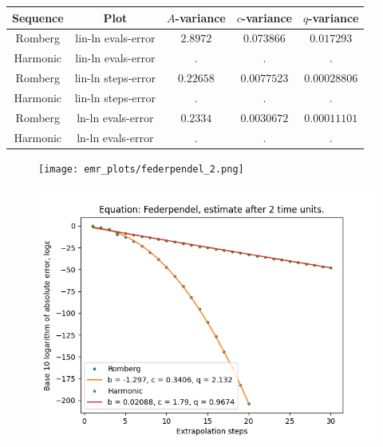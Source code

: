 \begin{table}[H]
    \centering
    \begin{tabular}{c|c||c|c|c}
Sequence & Plot & \(A\)-variance & \(c\)-variance & \(q\)-variance\\\hline
Romberg & lin-ln evals-error & \(2.8972\) & \(0.073866\) & \(0.017293\) \\
Harmonic & lin-ln evals-error & . & . & . \\
Romberg & lin-ln steps-error & \(0.22658\) & \(0.0077523\) & \(0.00028806\) \\
Harmonic & lin-ln steps-error & . & . & . \\
Romberg & ln-ln evals-error & \(0.2334\) & \(0.0030672\) & \(0.00011101\) \\
Harmonic & ln-ln evals-error & . & . & . \\
    \end{tabular}
    \label{tab:my_label}
\end{table}


\begin{figure}[H]
\centering
\begin{minipage}{0.45\textwidth}
\centering
\texttt{[image: emr\_plots/federpendel\_2.png]}
\end{minipage}
\begin{minipage}{0.45\textwidth}
\centering
\includegraphics[scale=0.45]{emr_plots/federpendel_2_hp_steps.png}
\end{minipage}
\end{figure}

